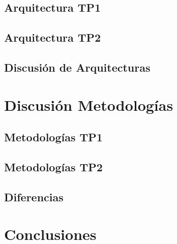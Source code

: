 \documentclass[a4paper, 11pt]{article}
\begin{document}
\subsection{Arquitectura TP1}
\subsection{Arquitectura TP2}
\subsection{Discusión de Arquitecturas}

\newpage
\section{Discusión Metodologías}
\subsection{Metodologías TP1}
\subsection{Metodologías TP2}
\subsection{Diferencias}

\newpage
\section{Conclusiones}
\end{document}

